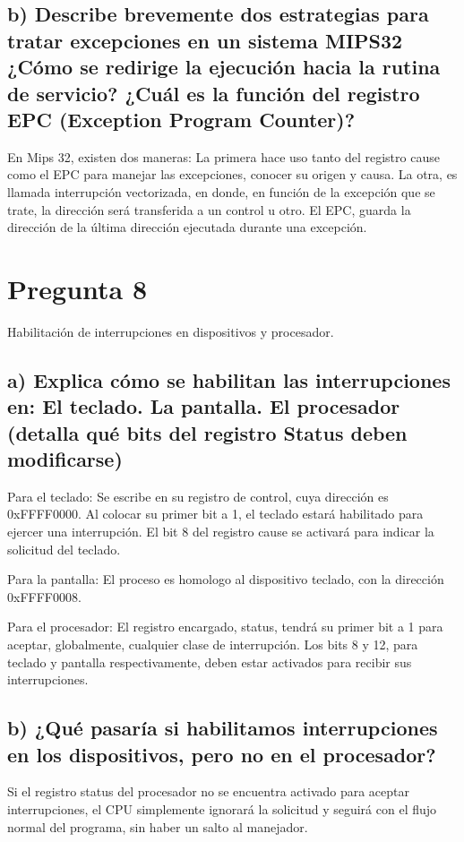 \documentclass[12pt]{article}
\begin{document}
\subsection*{b) Describe brevemente dos estrategias para tratar excepciones en un sistema MIPS32 ¿Cómo se redirige la ejecución hacia la rutina de servicio? ¿Cuál es la función del registro EPC (Exception Program Counter)?}

En Mips 32, existen dos maneras: La primera hace uso tanto del registro cause como el EPC para manejar las excepciones, conocer su origen y causa. La otra, es llamada interrupción vectorizada, en donde, en función de la excepción que se trate, la dirección será transferida a un control u otro. El EPC, guarda la dirección de la última dirección ejecutada durante una excepción.

\section*{Pregunta 8}
Habilitación de interrupciones en dispositivos y procesador.

\subsection*{a) Explica cómo se habilitan las interrupciones en: El teclado. La pantalla. El procesador (detalla qué bits del registro Status deben modificarse)}

Para el teclado: Se escribe en su registro de control, cuya dirección es 0xFFFF0000. Al colocar su primer bit a 1, el teclado estará habilitado para ejercer una interrupción. El bit 8 del registro cause se activará para indicar la solicitud del teclado.

Para la pantalla: El proceso es homologo al dispositivo teclado, con la dirección 0xFFFF0008.

Para el procesador: El registro encargado, status, tendrá su primer bit a 1 para aceptar, globalmente, cualquier clase de interrupción. Los bits 8 y 12, para teclado y pantalla respectivamente, deben estar activados para recibir sus interrupciones.

\subsection*{b) ¿Qué pasaría si habilitamos interrupciones en los dispositivos, pero no en el procesador?}

Si el registro status del procesador no se encuentra activado para aceptar interrupciones, el CPU simplemente ignorará la solicitud y seguirá con el flujo normal del programa, sin haber un salto al manejador.
\end{document}
